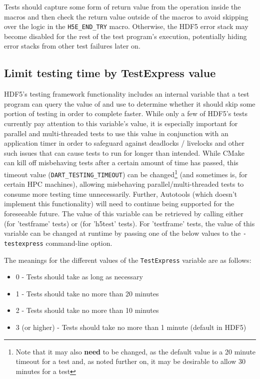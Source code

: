 \documentclass[../HDF5_RFC.tex]{subfiles}
\begin{document}
Tests should capture some form of return value from the operation inside the macros and then check the
return value outside of the macros to avoid skipping over the logic in the \texttt{H5E\_END\_TRY} macro.
Otherwise, the HDF5 error stack may become disabled for the rest of the test program's execution,
potentially hiding error stacks from other test failures later on.

\subsection{Limit testing time by TestExpress value}

HDF5's testing framework functionality includes an internal variable that a test program can query the
value of and use to determine whether it should skip some portion of testing in order to complete faster. While only a few of HDF5's tests currently pay attention to this variable's value, it is especially
important for parallel and multi-threaded tests to use this value in conjunction with an application
timer in order to safeguard against deadlocks / livelocks and other such issues that can cause tests
to run for longer than intended. While CMake can kill off misbehaving tests after a certain amount of
time has passed, this timeout value (\texttt{DART\_TESTING\_TIMEOUT}) can be changed\footnote{Note that
it may also \textbf{need} to be changed, as the default value is a 20 minute timeout for a test and, as
noted further on, it may be desirable to allow 30 minutes for a test} (and sometimes is, for certain HPC machines), allowing misbehaving parallel/multi-threaded tests to consume more testing time unnecessarily. Further, Autotools (which doesn't implement this functionality) will need to continue being supported for
the foreseeable future. The value of this variable can be retrieved by calling either
 (for 'testframe' tests) or 
(for 'h5test' tests). For 'testframe' tests, the value of this variable can be changed at runtime
by passing one of the below values to the \texttt{-testexpress} command-line option.

The meanings for the different values of the \texttt{TestExpress} variable are as follows:

\begin{itemize}

    \item 0 - Tests should take as long as necessary
    \item 1 - Tests should take no more than 20 minutes
    \item 2 - Tests should take no more than 10 minutes
    \item 3 (or higher) - Tests should take no more than 1 minute (default in HDF5)

\end{itemize}
\end{document}
